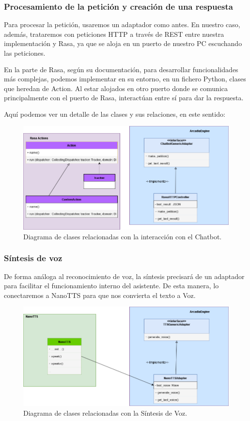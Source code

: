 \subsubsection{Procesamiento de la petición y creación de una respuesta}
Para procesar la petición, usaremos un adaptador como antes. En nuestro caso, además, trataremos con peticiones HTTP a través de REST entre nuestra implementación y Rasa, ya que se aloja en un puerto de nuestro PC escuchando las peticiones.

En la parte de Rasa, según su documentación, para desarrollar funcionalidades más complejas, podemos implementar en su entorno, en un fichero Python, clases que heredan de Action. Al estar alojados en otro puerto donde se comunica principalmente con el puerto de Rasa, interactúan entre sí para dar la respuesta.

Aquí podemos ver un detalle de las clases y sus relaciones, en este sentido:
\begin{figure}[H]
	\includegraphics[width=\textwidth]{imagenes/DiagramaClases_Chatbot.png}
	\caption{Diagrama de clases relacionadas con la interacción con el Chatbot.}
\end{figure}
\subsubsection{Síntesis de voz}
De forma análoga al reconocimiento de voz, la síntesis precisará de un adaptador para facilitar el funcionamiento interno del asistente. De esta manera, lo conectaremos a NanoTTS para que nos convierta el texto a Voz.

\begin{figure}[H]
	\includegraphics[width=\textwidth]{imagenes/DiagramaClases_TTS.png}
	\caption{Diagrama de clases relacionadas con la Síntesis de Voz.}
\end{figure}
